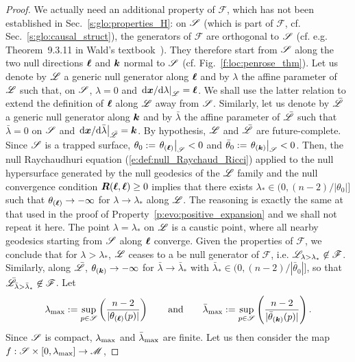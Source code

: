\begin{proof}
We actually need an additional property of $\mathscr{F}$,
which has not been established in Sec.~\ref{s:glo:properties_H}:
on  $\mathscr{S}$ (which is part of $\mathscr{F}$, cf. Sec.~\ref{s:glo:causal_struct}),
the generators of $\mathscr{F}$ are orthogonal to $\mathscr{S}$ (cf. e.g. Theorem~9.3.11
in Wald's textbook~\cite{Wald84}). They therefore start from $\mathscr{S}$ along
the two null directions $\bm{\ell}$ and $\bm{k}$ normal to $\mathscr{S}$ (cf. Fig.~\ref{f:loc:penrose_thm}). Let us denote by $\mathscr{L}$ a generic null
generator along $\bm{\ell}$ and by $\lambda$ the affine parameter of $\mathscr{L}$
such that, on $\mathscr{S}$, $\lambda = 0$ and $\left. \mathrm{d}\bm{x}/\mathrm{d}\lambda\right| _{\mathscr{L}} = \bm{\ell}$. We shall use
the latter relation to extend the definition of $\bm{\ell}$ along $\mathscr{L}$
away from $\mathscr{S}$. Similarly, let us denote by $\bar{\mathscr{L}}$ a generic null
generator along $\bm{k}$ and by $\bar\lambda$ the affine parameter of $\bar{\mathscr{L}}$
such that $\bar\lambda = 0$ on $\mathscr{S}$ and
$\left. \mathrm{d}\bm{x}/\mathrm{d}\bar\lambda \right| _{\bar{\mathscr{L}}}= \bm{k}$.
By hypothesis, $\mathscr{L}$ and $\bar{\mathscr{L}}$ are future-complete.
Since $\mathscr{S}$ is a trapped surface, $\theta_0 := \left. \theta_{(\bm{\ell})} \right| _{\mathscr{S}} < 0$
and $\bar\theta_0 := \left. \theta_{(\bm{k})} \right|_{\mathscr{S}}<0$.
Then, the
null Raychaudhuri equation
(\ref{e:def:null_Raychaud_Ricci}) applied to the null hypersurface
generated by the null geodesics of the $\mathscr{L}$ family and
the null convergence condition $\bm{R}(\bm{\ell},\bm{\ell}) \geq 0$ implies that there exists $\lambda_* \in (0, (n-2)/|\theta_0|]$
such that $\theta_{(\bm{\ell})} \to -\infty$ for $\lambda\to \lambda_*$ along $\mathscr{L}$.
The reasoning is exactly the same at that used in the proof of
Property~\ref{p:evo:positive_expansion} and we shall
not repeat it here. The point $\lambda=\lambda_*$ on $\mathscr{L}$ is a caustic point,
where all nearby geodesics starting from $\mathscr{S}$ along $\bm{\ell}$ converge.
Given the properties of $\mathscr{F}$, we conclude that for $\lambda > \lambda_*$, $\mathscr{L}$
ceases to a be null generator of $\mathscr{F}$, i.e.
$\mathscr{L}_{\lambda > \lambda_*} \not\in \mathscr{F}$.
Similarly, along $\bar{\mathscr{L}}$,
$\theta_{(\bm{k})} \to -\infty$ for $\bar\lambda\to \bar\lambda_*$
with $\bar\lambda_* \in (0, (n-2)/|\bar\theta_0|]$, so that
$\bar{\mathscr{L}}_{\bar\lambda > \bar\lambda_*} \not\in \mathscr{F}$.
Let
\[
    \lambda_{\rm max} := \sup_{p\in\mathscr{S}} \left(  \frac{n-2}{|\theta_{(\bm{\ell})} (p)|} \right)
    \qquad\mbox{and}\qquad
    \bar\lambda_{\rm max} := \sup_{p\in\mathscr{S}} \left(  \frac{n-2}{|\bar\theta_{(\bm{k})}(p)|} \right)    .
\]
Since $\mathscr{S}$ is compact, $\lambda_{\rm max}$ and $\bar\lambda_{\rm max}$ are finite.
Let us then consider the map $f: \mathscr{S} \times [0,\lambda_{\rm max}] \to \mathscr{M}$,

\end{proof}

